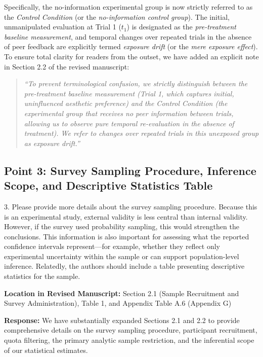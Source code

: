 \documentclass[11pt, letterpaper]{article}
\begin{document}
Specifically, the no-information experimental group is now strictly referred to as the \textit{Control Condition} (or the \textit{no-information control group}). The initial, unmanipulated evaluation at Trial 1 ($t_1$) is designated as the \textit{pre-treatment baseline measurement}, and temporal changes over repeated trials in the absence of peer feedback are explicitly termed \textit{exposure drift} (or the \textit{mere exposure effect}). To ensure total clarity for readers from the outset, we have added an explicit note in Section 2.2 of the revised manuscript:
\begin{quote}
\textit{``To prevent terminological confusion, we strictly distinguish between the pre-treatment baseline measurement (Trial 1, which captures initial, uninfluenced aesthetic preference) and the Control Condition (the experimental group that receives no peer information between trials, allowing us to observe pure temporal re-evaluation in the absence of treatment). We refer to changes over repeated trials in this unexposed group as exposure drift.''}
\end{quote}

\vspace{10pt}

\subsection*{Point 3: Survey Sampling Procedure, Inference Scope, and Descriptive Statistics Table}

\begin{reviewercomment}
3. Please provide more details about the survey sampling procedure. Because this is an experimental study, external validity is less central than internal validity. However, if the survey used probability sampling, this would strengthen the conclusions. This information is also important for assessing what the reported confidence intervals represent---for example, whether they reflect only experimental uncertainty within the sample or can support population-level inference. Relatedly, the authors should include a table presenting descriptive statistics for the sample.
\end{reviewercomment}

\textbf{Location in Revised Manuscript:} Section 2.1 (Sample Recruitment and Survey Administration), Table 1, and Appendix Table A.6 (Appendix G)

\textbf{Response:}
We have substantially expanded Sections 2.1 and 2.2 to provide comprehensive details on the survey sampling procedure, participant recruitment, quota filtering, the primary analytic sample restriction, and the inferential scope of our statistical estimates.
\end{document}
